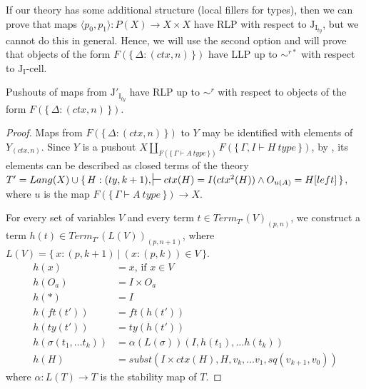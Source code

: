 \documentclass[reqno]{amsart}
\theoremstyle{definition}
\theoremstyle{remark}
\newcommand{\emptyCtx}{*}
\newcommand{\type}{type}
\newcommand{\I}{\mathrm{I}}
\newcommand{\J}{\mathrm{J}}
\newcommand{\class}[2]{#1\text{-}\mathrm{#2}}
\newcommand{\Icell}[1][\I]{\class{#1}{cell}}
\newcommand{\Jcell}[1][]{\Icell[\J#1]}
\numberwithin{figure}{section}
\begin{document}
If our theory has some additional structure (local fillers for types),
then we can prove that maps $\langle p_0, p_1 \rangle : P(X) \to X \times X$ have RLP with respect to $\J_{\I_{ty}}$, but we cannot do this in general.
Hence, we will use the second option and will prove that objects of the form $F(\{\,\Delta : (ctx,n)\,\})$ have LLP up to $\sim^{r*}$ with respect to $\Jcell[_\I]$.

\begin{lem}[Jty]
Pushouts of maps from $\J'_{\I_{ty}}$ have RLP up to $\sim^r$ with respect to objects of the form $F(\{\,\Delta : (ctx,n)\,\})$.
\end{lem}
\begin{proof}
Maps from $F(\{\,\Delta : (ctx,n)\,\})$ to $Y$ may be identified with elements of $Y_{(ctx,n)}$.
Since $Y$ is a pushout $X \amalg_{F(\{\,\Gamma \vdash A\ \type\,\})} F(\{\,\Gamma, I \vdash H\ \type\,\})$,
by , its elements can be described as closed terms of the theory
$T' = Lang(X) \cup \{\,H : (ty,k+1), \sststile{}{} ctx(H) = I(ctx^2(H)) \land O_{u(A)} = H[left]\,\}$,
where $u$ is the map $F(\{\,\Gamma \vdash A\ \type\,\}) \to X$.

For every set of variables $V$ and every term $t \in Term_{T'}(V)_{(p,n)}$,
we construct a term $h(t) \in Term_{T'}(L(V))_{(p,n+1)}$, where $L(V) = \{\,x : (p,k+1)\ |\ (x : (p,k)) \in V\,\}$.
\begin{align*}
h(x) & = x \text{, if } x \in V \\
h(O_a) & = I \times O_a \\
h(\emptyCtx) & = I \\
h(ft(t')) & = ft(h(t')) \\
h(ty(t')) & = ty(h(t')) \\
h(\sigma(t_1, \ldots t_k)) & = \alpha(L(\sigma))(I, h(t_1), \ldots h(t_k)) \\
h(H) & = subst(I \times ctx(H), H, v_k, \ldots v_1, sq(v_{k+1}, v_0))
\end{align*}
where $\alpha : L(T) \to T$ is the stability map of $T$.


\end{proof}
\end{document}
